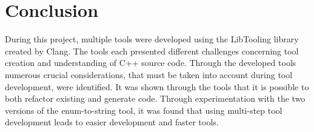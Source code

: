 \chapter{Conclusion}

During this project, multiple tools were developed using the LibTooling library created by Clang. 
The tools each presented different challenges concerning tool creation and understanding of C++ source code. 
Through the developed tools numerous crucial considerations, that must be taken into account during tool development, were identified.
It was shown through the tools that it is possible to both refactor existing and generate code.
Through experimentation with the two versions of the enum-to-string tool, it was found that using multi-step tool development leads to easier development and faster tools.
